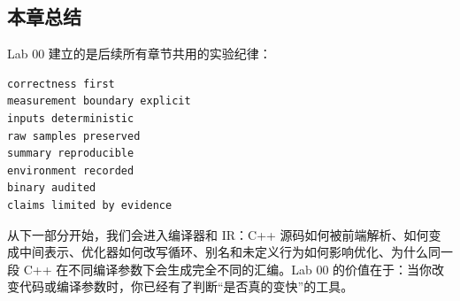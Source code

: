 \subsection{本章总结}

Lab 00 建立的是后续所有章节共用的实验纪律：

\begin{lstlisting}
correctness first
measurement boundary explicit
inputs deterministic
raw samples preserved
summary reproducible
environment recorded
binary audited
claims limited by evidence
\end{lstlisting}

从下一部分开始，我们会进入编译器和 IR：C++ 源码如何被前端解析、如何变成中间表示、优化器如何改写循环、别名和未定义行为如何影响优化、为什么同一段 C++ 在不同编译参数下会生成完全不同的汇编。Lab 00 的价值在于：当你改变代码或编译参数时，你已经有了判断“是否真的变快”的工具。
